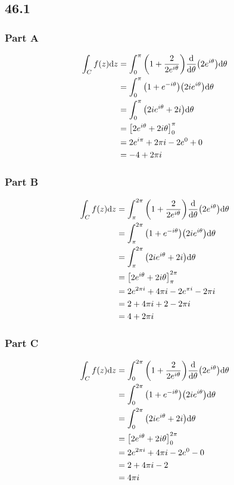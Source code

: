 \documentclass[12pt,titlepage]{extarticle}
\begin{document}

\subsection*{46.1}
\subsubsection*{Part A}
\begin{align*}
    \int_C f(z) \dd z &= \int_0^\pi \qty(1 + \frac{2}{2 e^{i \theta}}) \dv{\theta}(2e^{i \theta}) \dd \theta \\
    &= \int_0^\pi \qty(1 + e^{-i \theta})\qty(2i e^{i \theta}) \dd \theta \\
    &= \int_0^\pi \qty(2i e^{i \theta} + 2i) \dd \theta \\
    &= \qty[2e^{i \theta} + 2i \theta]_0^\pi \\
    &= 2e^{i \pi} + 2 \pi i - 2e^{0} + 0 \\
    &= -4 + 2 \pi i
\end{align*}

\subsubsection*{Part B}
\begin{align*}
    \int_C f(z) \dd z &= \int_\pi^{2 \pi} \qty(1 + \frac{2}{2 e^{i \theta}}) \dv{\theta}(2e^{i \theta}) \dd \theta \\
    &= \int_\pi^{2 \pi} \qty(1 + e^{-i \theta})\qty(2i e^{i \theta}) \dd \theta \\
    &= \int_\pi^{2 \pi} \qty(2i e^{i \theta} + 2i) \dd \theta \\
    &= \qty[2e^{i \theta} + 2i \theta]_{\pi}^{2 \pi} \\
    &= 2e^{2 \pi i} + 4 \pi i - 2e^{\pi i} - 2 \pi i \\
    &= 2 + 4 \pi i + 2 - 2 \pi i \\
    &= 4 + 2 \pi i
\end{align*}

\subsubsection*{Part C}
\begin{align*}
    \int_C f(z) \dd z &= \int_0^{2 \pi} \qty(1 + \frac{2}{2 e^{i \theta}}) \dv{\theta}(2e^{i \theta}) \dd \theta \\
    &= \int_0^{2 \pi} \qty(1 + e^{-i \theta})\qty(2i e^{i \theta}) \dd \theta \\
    &= \int_0^{2 \pi} \qty(2i e^{i \theta} + 2i) \dd \theta \\
    &= \qty[2e^{i \theta} + 2i \theta]_{0}^{2 \pi} \\
    &= 2e^{2 \pi i} + 4 \pi i - 2 e^{0} - 0 \\
    &= 2 + 4 \pi i - 2 \\
    &= 4 \pi i
\end{align*}
\end{document}

